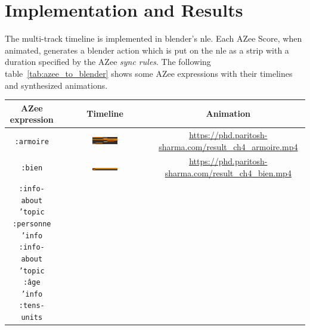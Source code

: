 \documentclass[../../main.tex]{subfiles}
\begin{document}
\section{Implementation and Results}
\label{ch:multi_track:implem_results}

The multi-track timeline is implemented in blender's \gls{nle}. Each AZee Score, when animated, generates a blender action which is put on the \gls{nle} as a strip with a duration specified by the AZee \emph{sync rules}. The following table~\ref{tab:azee_to_blender} shows some AZee expressions with their timelines and synthesized animations.

\begin{table}[h]
    \centering
    \begin{tabular}{|c|c|c|}
        \hline
        \textbf{AZee expression} & \textbf{Timeline} & \textbf{Animation} \\
        \hline
        \texttt{:armoire} & \includegraphics[width=0.3\textwidth]{chapters/multi_track/images/azee_timeline.png} & \url{https://phd.paritosh-sharma.com/result_ch4_armoire.mp4} \\
        \texttt{:bien} & \includegraphics[width=0.3\textwidth]{chapters/multi_track/images/bien_timeline.png} & \url{https://phd.paritosh-sharma.com/result_ch4_bien.mp4} \\
        \parbox{5cm}{\texttt{:info-about \\
              \hspace{0.5cm} 'topic \\
              \hspace{0.5cm} :personne \\
              \hspace{0.5cm} 'info \\
              \hspace{0.5cm} :info-about \\
              \hspace{1cm} 'topic \\
              \hspace{1cm} :âge \\
              \hspace{1cm} 'info \\
              \hspace{1cm} :tens-units \\
}}
\end{tabular}
\end{table}
\end{document}
